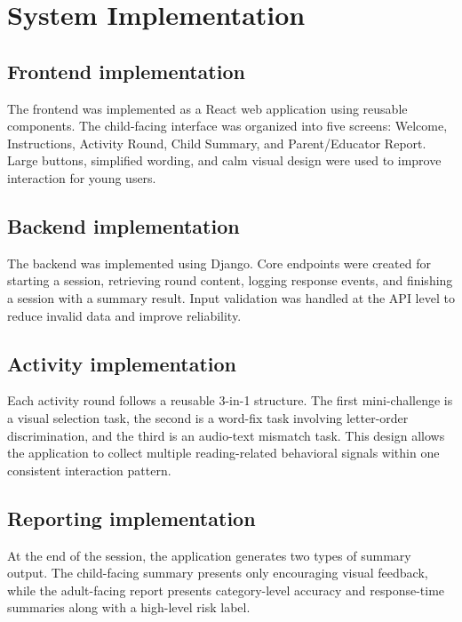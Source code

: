 \documentclass[conference]{IEEEtran}
\begin{document}
\section{System Implementation}

\subsection{Frontend implementation}

The frontend was implemented as a React web application using reusable components. The child-facing interface was organized into five screens: Welcome, Instructions, Activity Round, Child Summary, and Parent/Educator Report. Large buttons, simplified wording, and calm visual design were used to improve interaction for young users.

\subsection{Backend implementation}

The backend was implemented using Django. Core endpoints were created for starting a session, retrieving round content, logging response events, and finishing a session with a summary result. Input validation was handled at the API level to reduce invalid data and improve reliability.

\subsection{Activity implementation}

Each activity round follows a reusable 3-in-1 structure. The first mini-challenge is a visual selection task, the second is a word-fix task involving letter-order discrimination, and the third is an audio-text mismatch task. This design allows the application to collect multiple reading-related behavioral signals within one consistent interaction pattern.

\subsection{Reporting implementation}

At the end of the session, the application generates two types of summary output. The child-facing summary presents only encouraging visual feedback, while the adult-facing report presents category-level accuracy and response-time summaries along with a high-level risk label.
\end{document}
